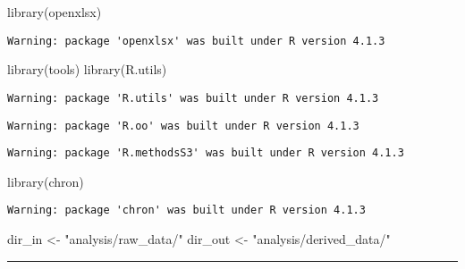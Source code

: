 \documentclass[
]{article}
\newenvironment{Shaded}{\begin{snugshade}}{\end{snugshade}}
\newcommand{\FunctionTok}[1]{\textcolor[rgb]{0.00,0.00,0.00}{#1}}
\newcommand{\NormalTok}[1]{#1}
\newcommand{\OtherTok}[1]{\textcolor[rgb]{0.56,0.35,0.01}{#1}}
\newcommand{\StringTok}[1]{\textcolor[rgb]{0.31,0.60,0.02}{#1}}
\begin{document}
\begin{Shaded}
\begin{Highlighting}[]
\FunctionTok{library}\NormalTok{(openxlsx)}
\end{Highlighting}
\end{Shaded}

\begin{verbatim}
Warning: package 'openxlsx' was built under R version 4.1.3
\end{verbatim}

\begin{Shaded}
\begin{Highlighting}[]
\FunctionTok{library}\NormalTok{(tools)}
\FunctionTok{library}\NormalTok{(R.utils)}
\end{Highlighting}
\end{Shaded}

\begin{verbatim}
Warning: package 'R.utils' was built under R version 4.1.3
\end{verbatim}

\begin{verbatim}
Warning: package 'R.oo' was built under R version 4.1.3
\end{verbatim}

\begin{verbatim}
Warning: package 'R.methodsS3' was built under R version 4.1.3
\end{verbatim}

\begin{Shaded}
\begin{Highlighting}[]
\FunctionTok{library}\NormalTok{(chron)}
\end{Highlighting}
\end{Shaded}

\begin{verbatim}
Warning: package 'chron' was built under R version 4.1.3
\end{verbatim}

\begin{Shaded}
\begin{Highlighting}[]
\NormalTok{dir\_in }\OtherTok{\textless{}{-}} \StringTok{"analysis/raw\_data/"}
\NormalTok{dir\_out }\OtherTok{\textless{}{-}} \StringTok{"analysis/derived\_data/"}
\end{Highlighting}
\end{Shaded}

\begin{center}\rule{0.5\linewidth}{0.5pt}\end{center}
\end{document}
